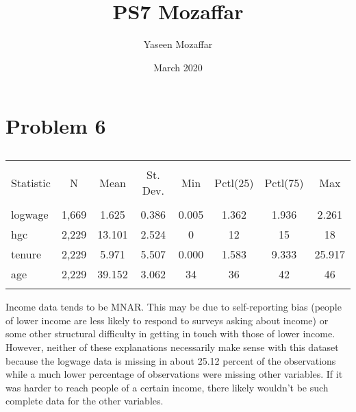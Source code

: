 \documentclass{article} \usepackage[utf8]{inputenc} \title{PS7 Mozaffar}
\author{Yaseen Mozaffar } \date{March 2020} \usepackage{natbib}
\begin{document}
 \maketitle \section{Problem 6} 
\begin{table}[!htbp]
  \centering
  \caption{}
  \label{} \begin{tabular}{@{\extracolsep{5pt}}lccccccc} 
\\[-1.8ex]\hline \hline \\[-1.8ex] Statistic & \multicolumn{1}{c}{N} & 
\multicolumn{1}{c}{Mean} & \multicolumn{1}{c}{St. Dev.} & 
\multicolumn{1}{c}{Min} & \multicolumn{1}{c}{Pctl(25)} & 
\multicolumn{1}{c}{Pctl(75)} & \multicolumn{1}{c}{Max} \\ \hline 
\\[-1.8ex] logwage & 1,669 & 1.625 & 0.386 & 0.005 & 1.362 & 1.936 & 
2.261 \\ hgc & 2,229 & 13.101 & 2.524 & 0 & 12 & 15 & 18 \\ tenure & 
2,229 & 5.971 & 5.507 & 0.000 & 1.583 & 9.333 & 25.917 \\ age & 2,229 & 
39.152 & 3.062 & 34 & 36 & 42 & 46 \\ \hline \\[-1.8ex] \end{tabular} 
\end{table} Income data tends to be MNAR. This may be due to 
self-reporting bias (people of lower income are less likely to respond 
to surveys asking about income) or some other structural difficulty in 
getting in touch with those of lower income. However, neither of these 
explanations necessarily make sense with this dataset because the 
logwage data is missing in about 25.12 percent of the observations while 
a much lower percentage of observations were missing other variables. If 
it was harder to reach people of a certain income, there likely wouldn't 
be such complete data for the other variables. \bigskip \bigskip 
\bigskip \bigskip \bigskip \bigskip \bigskip \bigskip \bigskip \bigskip 
\end{document}
